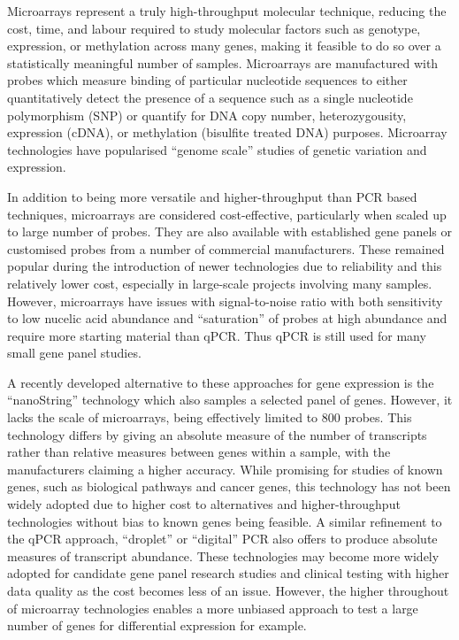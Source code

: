 Microarrays represent a truly high-throughput molecular technique, reducing the cost, time, and labour required to study molecular factors such as genotype, expression, or methylation across many genes, making it feasible to do so over a statistically meaningful number of samples. Microarrays are manufactured with probes which measure binding of particular nucleotide sequences to either quantitatively detect the presence of a sequence such as a single nucleotide polymorphism (SNP) or quantify for DNA copy number, heterozygousity, expression (cDNA), or methylation (bisulfite treated DNA) purposes. Microarray technologies have popularised ``genome scale'' studies of genetic variation and expression.

In addition to being more versatile and higher-throughput than PCR based techniques, microarrays are considered cost-effective, particularly when scaled up to large number of probes. They are also available with established gene panels or customised probes from a number of commercial manufacturers. These remained popular during the introduction of newer technologies due to reliability and this relatively lower cost, especially in large-scale projects involving many samples. However, microarrays have issues with signal-to-noise ratio with both sensitivity to low nucelic acid abundance and ``saturation'' of probes at high abundance and require more starting material than qPCR. Thus qPCR is still used for many small gene panel studies.

A recently developed alternative to these approaches for gene expression is the ``nanoString'' technology which also samples a selected panel of genes. However, it lacks the scale of microarrays, being effectively limited to 800 probes. This technology differs by giving an absolute measure of the number of transcripts rather than relative measures between genes within a sample, with the manufacturers claiming a higher accuracy. While promising for studies of known genes, such as biological pathways and cancer genes, this technology has not been widely adopted due to higher cost to alternatives and higher-throughput technologies without bias to known genes being feasible. A similar refinement to the qPCR approach, ``droplet'' or ``digital'' PCR also offers to produce absolute measures of transcript abundance. These technologies may become more widely adopted for candidate gene panel research studies and clinical testing with higher data quality as the cost becomes less of an issue. However, the higher throughout of microarray technologies enables a more unbiased approach to test a large number of genes for differential expression for example.

